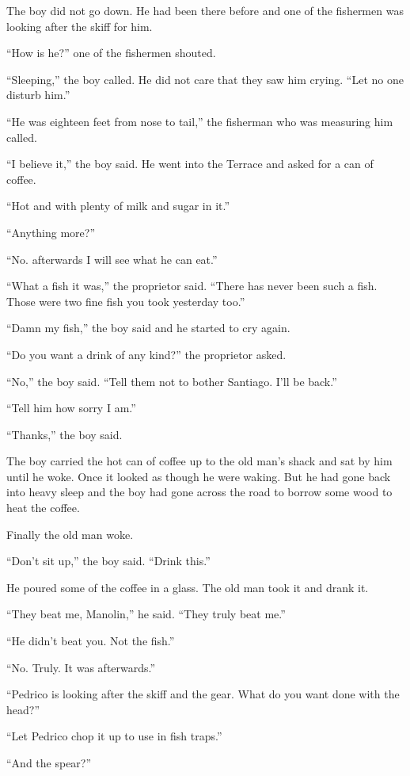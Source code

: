 \documentclass[fontset=ubuntu]{ctexrep}
\begin{document}
The boy did not go down. He had been there before and one of the fishermen
was looking after the skiff for him.

``How is he?'' one of the fishermen shouted.

``Sleeping,'' the boy called. He did not care that they saw him crying.
``Let no one disturb him.''

``He was eighteen feet from nose to tail,'' the fisherman who was measuring him called.

``I believe it,'' the boy said. He went into the Terrace and asked for a can of coffee.

``Hot and with plenty of milk and sugar in it.''

``Anything more?''

``No. \Gls{afterwards} I will see what he can eat.''

``What a fish it was,'' the \gls{proprietor} said. ``There has never been
such a fish. Those were two fine fish you took yesterday too.''

``Damn my fish,'' the boy said and he started to cry again.

``Do you want a drink of any kind?'' the proprietor asked.

``No,'' the boy said. ``Tell them not to \gls{bother} Santiago. I'll be
back.''

``Tell him how sorry I am.''

``Thanks,'' the boy said.

The boy carried the hot can of coffee up to the old man's shack and sat by
him until he woke. Once it looked as though he were waking. But he had gone
back into heavy sleep and the boy had gone across the road to borrow some
wood to \gls{heat} the coffee.

Finally the old man woke.

``Don't sit up,'' the boy said. ``Drink this.''

He poured some of the coffee in a glass. The old man took it and drank it.

``They beat me, Manolin,'' he said. ``They truly beat me.''

``He didn't beat you. Not the fish.''

``No. Truly. It was afterwards.''

``Pedrico is looking after the skiff and the gear. What do you want done with the head?''

``Let Pedrico chop it up to use in fish traps.''

``And the spear?''
\end{document}
